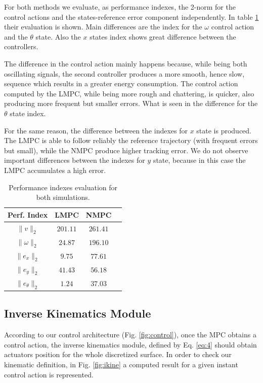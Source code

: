 \documentclass[conference]{IEEEtran}
\begin{document}
For both methods we evaluate, as performance indexes, the 2-norm for the control actions and the states-reference error component independently. In table \ref{tab:index} their evaluation is shown. Main differences are the index for the \(\omega\) control action and the \(\theta\) state. Also the \(x\) states index shows great difference between the controllers.

The difference in the control action mainly happens because, while being both oscillating signals, the second controller produces a more smooth, hence slow, sequence which results in a greater energy consumption. The control action computed by the LMPC, while being more rough and chattering, is quicker, also producing more frequent but smaller errors. What is seen in the difference for the \(\theta\) state index.

For the same reason, the difference between the indexes for \(x\) state is produced. The LMPC is able to follow reliably the reference trajectory (with frequent errors but small), while the NMPC produce higher tracking error. We do not observe important differences between the indexes for \(y\) state, because in this case the LMPC accumulates a high error.

\begin{table}
\centering
\begin{tabular}{|c|c|c|c|}
	\hline
	Perf. Index & LMPC & NMPC \\
    \hline
    \hline
	\(\lVert v\rVert_{2}\) & \(201.11\) & \(261.41\) \\
    \(\lVert \omega\rVert_{2}\) & \(24.87\) & \(196.10\) \\
    \(\lVert e_x\rVert_{2}\) & \(9.75\) & \(77.61\) \\
    \(\lVert e_y\rVert_{2}\) & \(41.43\) & \(56.18\) \\
    \(\lVert e_{\theta}\rVert_{2}\) & \(1.24\) & \(37.03\) \\
    \hline
\end{tabular}
\caption{\label{tab:index}Performance indexes evaluation for both simulations.}
\end{table}


\subsection{Inverse Kinematics Module}\label{CE}

According to our control architecture (Fig. \ref{fig:control}), once the MPC obtains a control action, the inverse kinematics module, defined by Eq. \ref{eq:4} should obtain actuators position for the whole discretized surface. In order to check our kinematic definition, in Fig. \ref{fig:ikine} a computed result for a given instant control action is represented.
\end{document}
